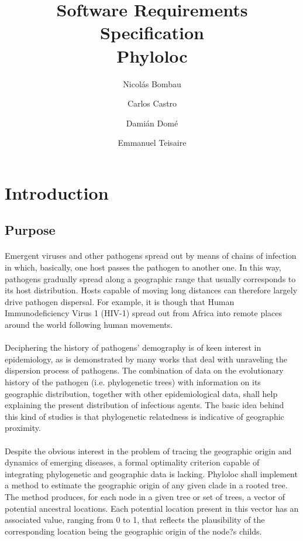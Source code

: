 \documentclass[10pt,a4paper]{article}
\author{Nicol\'as Bombau \and Carlos Castro \and Dami\'an Dom\'e \and Emmanuel Teisaire}
\title{Software Requirements Specification \\ Phyloloc}
\begin{document}
\maketitle

\pagebreak
\tableofcontents
\pagebreak

\section{Introduction}
  \subsection{Purpose}
  \paragraph{}

Emergent viruses and other pathogens spread out by means of chains of infection in which, basically, one host passes the pathogen to another one. In this way, pathogens gradually spread along a geographic range that usually corresponds to its host distribution. Hosts capable of moving long distances can therefore largely drive pathogen
dispersal. For example, it is though that Human Immunodeficiency Virus 1 (HIV-1) spread out from Africa into remote places around the world following human movements.
\paragraph{}
Deciphering the history of pathogens' demography is of keen interest in epidemiology, as is demonstrated by many works that deal with unraveling the dispersion process of pathogens. The combination of data on the evolutionary history of the pathogen (i.e. phylogenetic trees) with information on its geographic distribution, together with other epidemiological data, shall help explaining the present distribution of infectious agents. The basic idea behind this kind of studies is that phylogenetic relatedness is indicative of geographic proximity.
\paragraph{}
Despite the obvious interest in the problem of tracing the geographic origin and dynamics of emerging diseases, a formal optimality criterion capable of integrating phylogenetic and geographic data is lacking. Phyloloc shall implement a method to estimate the geographic origin of any given clade in a rooted tree. The method produces, for each node in a given tree or set of trees, a vector of potential ancestral locations. Each potential location present in this vector has an associated value, ranging from 0 to 1, that reflects the plausibility of the corresponding location being the geographic origin of the node?s childs.
\end{document}
